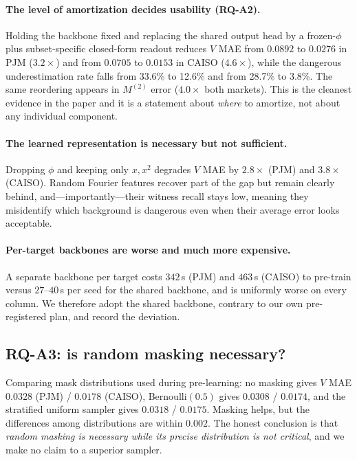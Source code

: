 \documentclass[preprint,12pt]{elsarticle}
\begin{document}
\paragraph{The level of amortization decides usability (RQ-A2).}
Holding the backbone fixed and replacing the shared output head by a frozen-$\phi$ plus
subset-specific closed-form readout reduces $V$ MAE from $0.0892$ to $0.0276$ in PJM
($3.2\times$) and from $0.0705$ to $0.0153$ in CAISO ($4.6\times$), while the dangerous
underestimation rate falls from 33.6\% to 12.6\% and from 28.7\% to 3.8\%. The same
reordering appears in $M^{(2)}$ error ($4.0\times$ both markets). This is the cleanest
evidence in the paper and it is a statement about \emph{where} to amortize, not about any
individual component.

\paragraph{The learned representation is necessary but not sufficient.}
Dropping $\phi$ and keeping only $x,x^2$ degrades $V$ MAE by $2.8\times$ (PJM) and
$3.8\times$ (CAISO). Random Fourier features recover part of the gap but remain clearly
behind, and---importantly---their witness recall stays low, meaning they misidentify which
background is dangerous even when their average error looks acceptable.

\paragraph{Per-target backbones are worse and much more expensive.}
A separate backbone per target costs $342$\,s (PJM) and $463$\,s (CAISO) to pre-train
versus $27$--$40$\,s per seed for the shared backbone, and is uniformly worse on every
column. We therefore adopt the shared backbone, contrary to our own pre-registered plan,
and record the deviation.

\subsection{RQ-A3: is random masking necessary?}
Comparing mask distributions used during pre-learning: no masking gives $V$ MAE $0.0328$
(PJM) / $0.0178$ (CAISO), Bernoulli$(0.5)$ gives $0.0308$ / $0.0174$, and the stratified
uniform sampler gives $0.0318$ / $0.0175$. Masking helps, but the differences among
distributions are within $0.002$. The honest conclusion is that \emph{random masking is
necessary while its precise distribution is not critical}, and we make no claim to a
superior sampler.
\end{document}
